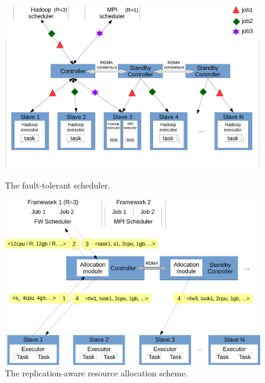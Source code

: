 \begin{figure}[!htb]
    \begin{minipage}{.49\textwidth}
        \vspace{-.15in}
        \includegraphics[width=0.34\textheight]{figures/scheduler_arch.eps}
        \vspace{-.25in}
        \caption{The \tripod fault-tolerant scheduler.}
        \label{fig:scheduler-arch}
    \end{minipage}
    \begin{minipage}{0.51\textwidth}
        \vspace{-.15in}
        \includegraphics[width=0.34\textheight]{figures/scheduler_flow.eps}
        \vspace{-.05in}
        \caption{The replication-aware resource allocation scheme.}
        \label{fig:scheduler-workflow}
    \end{minipage}
\end{figure}

